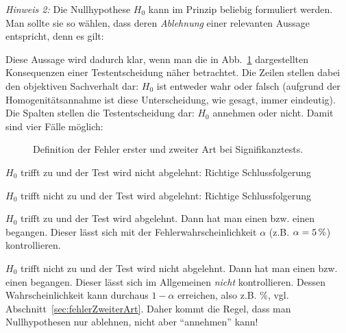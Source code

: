 \emph{Hinweis 2:}  Die Nullhypothese $H_0$ kann im Prinzip beliebig
formuliert werden. Man sollte sie so w\"ahlen, dass deren
\emph{Ablehnung} einer relevanten Aussage entspricht, denn
es gilt:


Diese Aussage wird dadurch klar, wenn man die in
Abb.~\ref{fig:fehlerErsterZweiterArt} dargestellten 
Konsequenzen einer Testentscheidung n\"aher betrachtet. Die Zeilen
stellen dabei den objektiven Sachverhalt dar: $H_0$ ist entweder wahr
oder falsch (aufgrund der Homogenit\"atsannahme ist diese
Unterscheidung, wie gesagt, immer eindeutig). Die Spalten stellen die
Testentscheidung dar: $H_0$ annehmen oder nicht. Damit sind vier
F\"alle m\"oglich:

\begin{figure}
\caption{\label{fig:fehlerErsterZweiterArt}Definition der Fehler
erster und zweiter Art bei Signifikanztests.
}
\end{figure}
\bi
\item $H_0$ trifft zu und der Test wird nicht abgelehnt: Richtige Schlussfolgerung
\item $H_0$ trifft nicht zu und der Test wird abgelehnt: Richtige Schlussfolgerung
\item $H_0$ trifft zu und der Test wird abgelehnt. Dann hat man einen
 bzw. einen 
begangen. Dieser l\"asst sich mit der Fehlerwahrscheinlichkeit
$\alpha$ (z.B. $\alpha=\unit[5]{\%}$) kontrollieren.
\item $H_0$ trifft nicht zu und der Test wird nicht abgelehnt. 
Dann hat man einen
 bzw. einen 
begangen. Dieser l\"asst sich im Allgemeinen \emph{nicht}
kontrollieren. Dessen  Wahrscheinlichkeit kann durchaus $1-\alpha$
erreichen, also z.B. \unit[95]{\%},
vgl. Abschnitt~\ref{sec:fehlerZweiterArt}.
 Daher kommt die Regel, dass man
Nullhypothesen nur ablehnen, nicht aber ``annehmen'' kann!
\ei

